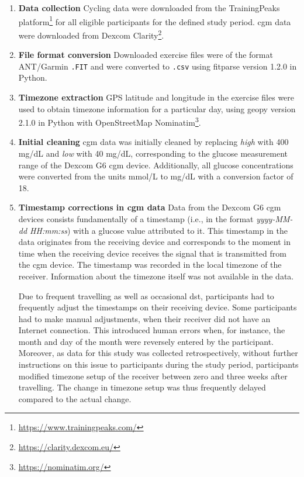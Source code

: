 \documentclass[11pt,a4paper]{article}
\begin{document}
\begin{enumerate}[label=\textbf{\arabic*}.]
\item \textbf{Data collection}
Cycling data were downloaded from the TrainingPeaks platform\footnote{\url{https://www.trainingpeaks.com/}} for all eligible participants for the defined study period. \Gls{cgm} data were downloaded from Dexcom Clarity\footnote{\url{https://clarity.dexcom.eu/}}.

\item \textbf{File format conversion} 
Downloaded exercise files were of the format ANT/Garmin \texttt{.FIT} and were converted to \texttt{.csv} using fitparse \cite{fitparse} version 1.2.0 in Python. 

\item \textbf{Timezone extraction}
GPS latitude and longitude in the exercise files were used to obtain timezone information for a particular day, using geopy version 2.1.0 \cite{geopy} in Python with OpenStreetMap Nominatim\footnote{\url{https://nominatim.org/}}.

\item \textbf{Initial cleaning} 
\Gls{cgm} data was initially cleaned by replacing \textit{high} with 400 mg/dL and \textit{low} with 40 mg/dL, corresponding to the glucose measurement range of the Dexcom G6 \gls{cgm} device. Additionally, all glucose concentrations were converted from the units mmol/L to mg/dL with a conversion factor of 18. 

\item \textbf{Timestamp corrections in \gls{cgm} data} 
Data from the Dexcom G6 \gls{cgm} devices consists fundamentally of a timestamp (i.e., in the format \textit{yyyy-MM-dd HH:mm:ss}) with a glucose value attributed to it. This timestamp in the data originates from the receiving device and corresponds to the moment in time when the receiving device receives the signal that is transmitted from the \gls{cgm} device. The timestamp was recorded in the local timezone of the receiver. Information about the timezone itself was not available in the data. 

Due to frequent travelling as well as occasional \gls{dst}, participants had to frequently adjust the timestamps on their receiving device. Some participants had to make manual adjustments, when their receiver did not have an Internet connection. This introduced human errors when, for instance, the month and day of the month were reversely entered by the participant. Moreover, as data for this study was collected retrospectively, without further instructions on this issue to participants during the study period, participants modified timezone setup of the receiver between zero and three weeks after travelling. The change in timezone setup was thus frequently delayed compared to the actual change. 


\end{enumerate}
\end{document}
